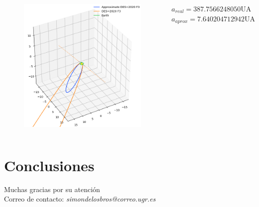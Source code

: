 \documentclass{beamer}
\begin{document}
\begin{frame}
\begin{columns}
	\begin{figure}[H]
	\centering
	\includegraphics[scale=0.25]{images/neowise_far.png}
	\end{figure}
\begin{table}[H]
\centering
{}
\end{table}

\vspace{0.75cm}
\begin{small}
\begin{center}
	$a_{real}=387.7566248050 \text{UA}$\\
	$a_{aprox}=7.640204712942 \text{UA}$
\end{center}
\end{small}
\end{columns}
\end{frame}


\section{Conclusiones}


\begin{frame}

\vspace{1cm}

\begin{center}
\Large Muchas gracias por su atención\\
\vspace{0.7cm}
\footnotesize Correo de contacto: \textit{simondelosbros@correo.ugr.es}
\end{center}

\end{frame}
\end{document}
